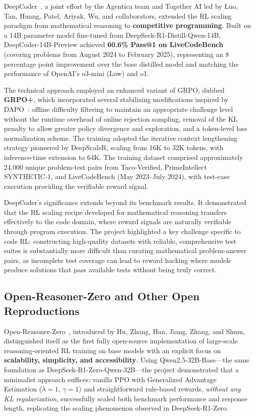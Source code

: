 DeepCoder~\cite{xu2025deepcoder}, a joint effort by the Agentica team and Together AI led by Luo, Tan, Huang, Patel, Ariyak, Wu, and collaborators, extended the RL scaling paradigm from mathematical reasoning to \textbf{competitive programming}. Built on a 14B parameter model fine-tuned from DeepSeek-R1-Distill-Qwen-14B, DeepCoder-14B-Preview achieved \textbf{60.6\% Pass@1 on LiveCodeBench} (covering problems from August 2024 to February 2025), representing an 8 percentage point improvement over the base distilled model and matching the performance of OpenAI's o3-mini (Low) and o1.

The technical approach employed an enhanced variant of GRPO, dubbed \textbf{GRPO+}, which incorporated several stabilizing modifications inspired by DAPO~\cite{yu2025dapo}: offline difficulty filtering to maintain an appropriate challenge level without the runtime overhead of online rejection sampling, removal of the KL penalty to allow greater policy divergence and exploration, and a token-level loss normalization scheme. The training adopted the iterative context lengthening strategy pioneered by DeepScaleR, scaling from 16K to 32K tokens, with inference-time extension to 64K. The training dataset comprised approximately 24,000 unique problem-test pairs from Taco-Verified, PrimeIntellect SYNTHETIC-1, and LiveCodeBench (May 2023--July 2024), with test-case execution providing the verifiable reward signal.

DeepCoder's significance extends beyond its benchmark results. It demonstrated that the RL scaling recipe developed for mathematical reasoning transfers effectively to the code domain, where reward signals are naturally verifiable through program execution. The project highlighted a key challenge specific to code RL: constructing high-quality datasets with reliable, comprehensive test suites is substantially more difficult than curating mathematical problem-answer pairs, as incomplete test coverage can lead to reward hacking where models produce solutions that pass available tests without being truly correct.

\subsection*{Open-Reasoner-Zero and Other Open Reproductions}

Open-Reasoner-Zero~\cite{hu2025openreasonerzero}, introduced by Hu, Zhang, Han, Jiang, Zhang, and Shum, distinguished itself as the first fully open-source implementation of large-scale reasoning-oriented RL training on base models with an explicit focus on \textbf{scalability, simplicity, and accessibility}. Using Qwen2.5-32B-Base---the same foundation as DeepSeek-R1-Zero-Qwen-32B---the project demonstrated that a minimalist approach suffices: vanilla PPO with Generalized Advantage Estimation ($\lambda=1$, $\gamma=1$) and straightforward rule-based rewards, \emph{without any KL regularization}, successfully scaled both benchmark performance and response length, replicating the scaling phenomenon observed in DeepSeek-R1-Zero.

